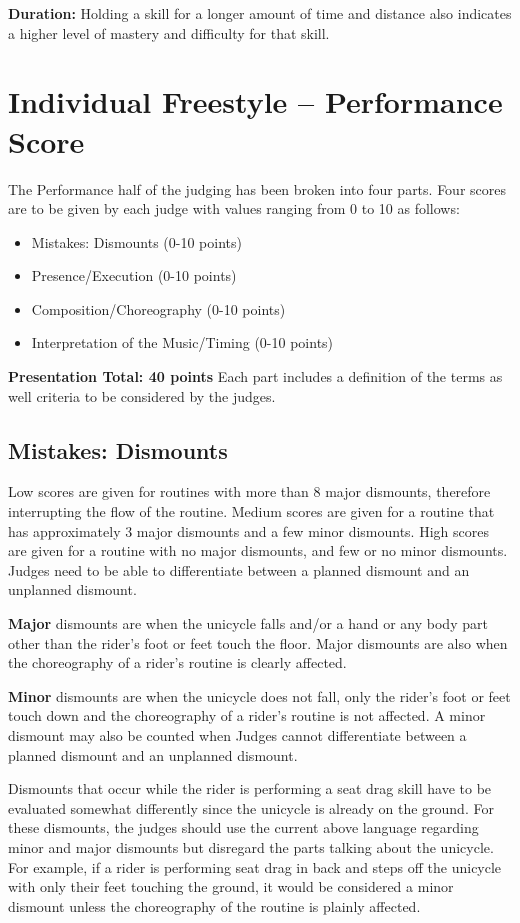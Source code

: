 \textbf{Duration:} Holding a skill for a longer amount of time and distance also indicates a higher level of mastery and difficulty for that skill.

\section{Individual Freestyle -- Performance Score \label{sec:freestyle_individual-performance-score}}
The Performance half of the judging has been broken into four parts.
Four scores are to be given by each judge with values ranging from 0 to 10 as follows:
\begin{itemize}
\item Mistakes: Dismounts (0-10 points) 
\item Presence/Execution (0-10 points)
\item Composition/Choreography (0-10 points)
\item Interpretation of the Music/Timing (0-10 points)
\end{itemize}
\textbf{Presentation Total: 40 points}
Each part includes a definition of the terms as well criteria to be considered by the judges.

\subsection{Mistakes: Dismounts}
Low scores are given for routines with more than 8 major dismounts, therefore interrupting the flow of the routine.
Medium scores are given for a routine that has approximately 3 major dismounts and a few minor dismounts.
High scores are given for a routine with no major dismounts, and few or no minor dismounts.
Judges need to be able to differentiate between a planned dismount and an unplanned dismount.

\textbf{Major} dismounts are when the unicycle falls and/or a hand or any body part other than the rider's foot or feet touch the floor.
Major dismounts are also when the choreography of a rider's routine is clearly affected.

\textbf{Minor} dismounts are when the unicycle does not fall, only the rider's foot or feet touch down and the choreography of a rider's routine is not affected.
A minor dismount may also be counted when Judges cannot differentiate between a planned dismount and an unplanned dismount.

Dismounts that occur while the rider is performing a seat drag skill have to be evaluated somewhat differently since the unicycle is already on the ground.
For these dismounts, the judges should use the current above language regarding minor and major dismounts but disregard the parts talking about the unicycle.
For example, if a rider is performing seat drag in back and steps off the unicycle with only their feet touching the ground, it would be considered a minor dismount unless the choreography of the routine is plainly affected.

